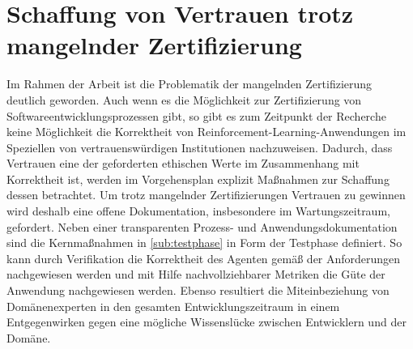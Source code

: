 \section{Schaffung von Vertrauen trotz mangelnder Zertifizierung}
Im Rahmen der Arbeit ist die Problematik der mangelnden Zertifizierung deutlich geworden.
Auch wenn es die Möglichkeit zur Zertifizierung von Softwareentwicklungsprozessen gibt, so gibt es zum Zeitpunkt der Recherche keine Möglichkeit die Korrektheit von Reinforcement-Learning-Anwendungen im Speziellen von vertrauenswürdigen Institutionen nachzuweisen.
Dadurch, dass Vertrauen eine der geforderten ethischen Werte im Zusammenhang mit Korrektheit ist, werden im Vorgehensplan explizit Maßnahmen zur Schaffung dessen betrachtet.
Um trotz mangelnder Zertifizierungen Vertrauen zu gewinnen wird deshalb eine offene Dokumentation, insbesondere im Wartungszeitraum, gefordert.
Neben einer transparenten Prozess- und Anwendungsdokumentation sind die Kernmaßnahmen in \autoref{sub:testphase} in Form der Testphase definiert.
So kann durch Verifikation die Korrektheit des Agenten gemäß der Anforderungen nachgewiesen werden und mit Hilfe nachvollziehbarer Metriken die Güte der Anwendung nachgewiesen werden.
Ebenso resultiert die Miteinbeziehung von Domänenexperten in den gesamten Entwicklungszeitraum in einem Entgegenwirken gegen eine mögliche Wissenslücke zwischen Entwicklern und der Domäne.